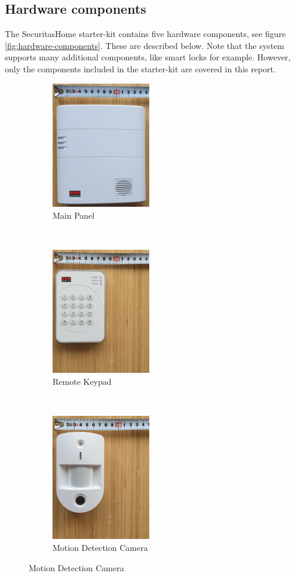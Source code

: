 \subsection{Hardware components} \label{ch:system:hardware}
The SecuritasHome starter-kit contains five hardware components, see figure \ref{fig:hardware-components}. These are described below. Note that the system supports many additional components, like smart locks for example. However, only the components included in the starter-kit are covered in this report.
\begin{figure}[!ht]
    \centering
    \begin{subfigure}[t]{0.33\textwidth}
        \centering
        \includegraphics[height=2.15in]{images/main-panel.png}
        \caption{Main Panel}
        \label{fig:main-panel}
    \end{subfigure}%
    ~
    \begin{subfigure}[t]{0.33\textwidth}
        \centering
        \includegraphics[height=2.15in]{images/keypad.png}
        \caption{Remote Keypad}
        \label{fig:remote-keypad}
    \end{subfigure}%
    ~
    \begin{subfigure}[t]{0.33\textwidth}
        \centering
        \includegraphics[height=2.15in]{images/camera.png}
        \caption{Motion Detection Camera}
        \label{fig:motion-camera}
    \end{subfigure}
    

\end{figure}
